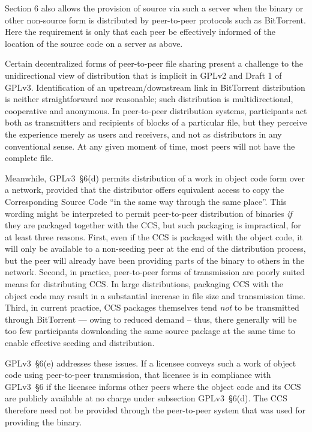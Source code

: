
Section 6 also allows the provision of source via such a server when the
binary or other non-source form is distributed by peer-to-peer protocols such
as BitTorrent. Here the requirement is only that each peer be effectively
informed of the location of the source code on a server as above.

Certain decentralized forms of peer-to-peer file sharing present a challenge
to the unidirectional view of distribution that is implicit in GPLv2 and
Draft 1 of GPLv3.  Identification of an upstream/downstream link in
BitTorrent distribution is neither straightforward nor reasonable; such
distribution is multidirectional, cooperative and anonymous.  In peer-to-peer
distribution systems, participants act both as transmitters and recipients of
blocks of a particular file, but they perceive the experience merely as users
and receivers, and not as distributors in any conventional sense.  At any
given moment of time, most peers will not have the complete file.

Meanwhile, GPLv3~\S6(d) permits distribution of a work in object code form
over a network, provided that the distributor offers equivalent access to
copy the Corresponding Source Code ``in the same way through the same
place''.  This wording might be interpreted to permit peer-to-peer
distribution of binaries \textit{if} they are packaged together with the CCS,
but such packaging is impractical, for at least three reasons.  First, even if
the CCS is packaged with the object code, it will only be available to a
non-seeding peer at the end of the distribution process, but the peer will
already have been providing parts of the binary to others in the network.
Second, in practice, peer-to-peer forms of transmission are poorly suited
means for distributing CCS.  In large distributions, packaging CCS with the
object code may result in a substantial increase in file size and
transmission time.  Third, in current practice, CCS packages themselves tend
\textit{not} to be transmitted through BitTorrent --- owing to reduced demand
-- thus, there generally will be too few participants downloading the same
source package at the same time to enable effective seeding and distribution.

GPLv3~\S6(e) addresses these issues.  If a licensee conveys such a work of
object code using peer-to-peer transmission, that licensee is in compliance
with GPLv3~\S6 if the licensee informs other peers where the object code and
its CCS are publicly available at no charge under subsection GPLv3~\S6(d).
The CCS therefore need not be provided through the peer-to-peer system that
was used for providing the binary.

